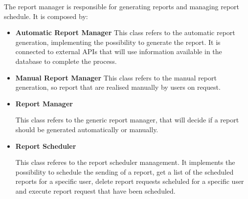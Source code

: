 \documentclass{article}
\begin{document}
The report manager is responsible for generating reports and managing report schedule. It is composed by:

\begin{itemize}

\item \textbf{Automatic Report Manager}
This class refers to the automatic report generation, implementing the possibility to generate the report. It is connected to external APIs that will use information available in the database to complete the process.

\item \textbf{Manual Report Manager}
This class refers to the manual report generation, so report that are realised manually by users on request.

\item \textbf{Report Manager}

This class refers to the generic report manager, that will decide if a report should be generated automatically or manually.

\item \textbf{Report Scheduler}

This class referes to the report scheduler management. It implements the possibility to schedule the sending of a report, get a list of the scheduled reports for a specific user, delete report requests scheluled for a specific user and execute report request that have been scheduled.

\end{itemize}
\end{document}
